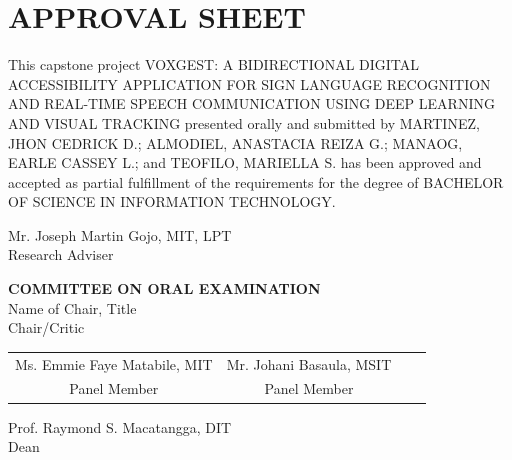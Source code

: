 
\chapter*{\textbf{APPROVAL SHEET}}
\pagestyle{plain}
\setcounter{page}{2}
\begin{singlespace}
\indent This capstone project VOXGEST: A BIDIRECTIONAL DIGITAL ACCESSIBILITY APPLICATION FOR SIGN LANGUAGE RECOGNITION AND REAL-TIME SPEECH COMMUNICATION USING DEEP LEARNING AND VISUAL TRACKING presented orally and submitted by MARTINEZ, JHON CEDRICK D.; ALMODIEL, ANASTACIA REIZA G.; MANAOG, EARLE CASSEY L.; and TEOFILO, MARIELLA S. has been approved and accepted as partial fulfillment of the requirements for the degree of BACHELOR OF SCIENCE IN INFORMATION TECHNOLOGY.

\vspace{2em}
\begin{flushright}
    Mr. Joseph Martin Gojo, MIT, LPT \\
    Research Adviser
\end{flushright}

\vspace{10em}

\begin{center}
\textbf{COMMITTEE ON ORAL EXAMINATION} \\
\vspace{3em}
Name of Chair, Title \\
Chair/Critic \\ 
\vspace{2em}

\begin{tabular}{cccc}
Ms. Emmie Faye Matabile, MIT & \hspace{4cm} Mr. Johani Basaula, MSIT \\
\vspace{2em}
Panel Member & \hspace{4cm} Panel Member \\
\end{tabular}

\vspace{5em}
Prof. Raymond S. Macatangga, DIT \\
Dean \\ 
\end{center}
\end{singlespace}
\pagebreak{}
